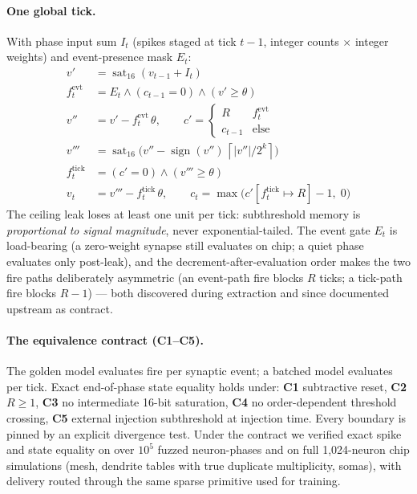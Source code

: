 \documentclass[11pt]{article}
\newcommand{\sat}{\operatorname{sat}_{16}}
\newcommand{\ceilleak}[1]{\left\lceil |#1| / 2^{k} \right\rceil}
\begin{document}
\paragraph{One global tick.} With phase input sum $I_t$ (spikes staged at
tick $t{-}1$, integer counts $\times$ integer weights) and event-presence
mask $E_t$:
\begin{align}
  v' &= \sat(v_{t-1} + I_t) \\
  f^{\mathrm{evt}}_t &= E_t \wedge (c_{t-1} = 0) \wedge (v' \geq \theta) \\
  v'' &= v' - f^{\mathrm{evt}}_t\,\theta, \qquad
        c' = \begin{cases} R & f^{\mathrm{evt}}_t \\ c_{t-1} & \text{else} \end{cases} \\
  v''' &= \sat\!\big(v'' - \operatorname{sign}(v'')\,\ceilleak{v''}\big) \\
  f^{\mathrm{tick}}_t &= (c' = 0) \wedge (v''' \geq \theta) \\
  v_t &= v''' - f^{\mathrm{tick}}_t\,\theta, \qquad
        c_t = \max\!\big(c'[f^{\mathrm{tick}}_t \mapsto R] - 1,\; 0\big)
\end{align}
The ceiling leak loses at least one unit per tick: subthreshold memory is
\emph{proportional to signal magnitude}, never exponential-tailed. The
event gate $E_t$ is load-bearing (a zero-weight synapse still evaluates on
chip; a quiet phase evaluates only post-leak), and the
decrement-after-evaluation order makes the two fire paths deliberately
asymmetric (an event-path fire blocks $R$ ticks; a tick-path fire blocks
$R{-}1$) --- both discovered during extraction and since documented upstream
as contract.

\paragraph{The equivalence contract (C1--C5).} The golden model evaluates
fire per synaptic event; a batched model evaluates per tick. Exact
end-of-phase state equality holds under: \textbf{C1} subtractive reset,
\textbf{C2} $R \geq 1$, \textbf{C3} no intermediate 16-bit saturation,
\textbf{C4} no order-dependent threshold crossing, \textbf{C5} external
injection subthreshold at injection time. Every boundary is pinned by an
explicit divergence test. Under the contract we verified exact spike and
state equality on over $10^5$ fuzzed neuron-phases and on full 1{,}024-neuron
chip simulations (mesh, dendrite tables with true duplicate multiplicity,
somas), with delivery routed through the same sparse primitive used for
training.
\end{document}
